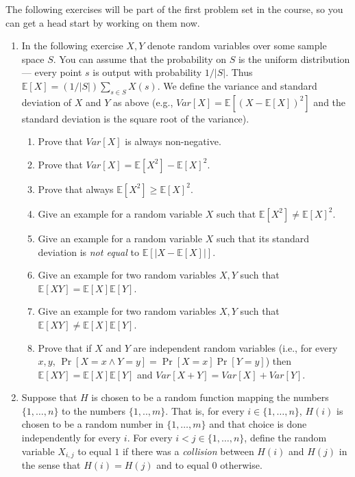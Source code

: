 The following exercises will be part of the first problem set in the
course, so you can get a head start by working on them now.

\begin{enumerate}
\def\labelenumi{\arabic{enumi}.}
\item
  In the following exercise \(X,Y\) denote random variables over some
  sample space \(S\). You can assume that the probability on \(S\) is
  the uniform distribution--- every point \(s\) is output with
  probability \(1/|S|\). Thus
  \({\mathbb{E}}[X]= (1/|S|)\sum_{s\in S}X(s)\). We define the variance
  and standard deviation of \(X\) and \(Y\) as above (e.g.,
  \(Var[X] = {\mathbb{E}}[ (X-{\mathbb{E}}[X])^2 ]\) and the standard
  deviation is the square root of the variance).

  \begin{enumerate}
  \def\labelenumii{\arabic{enumii}.}
  \item
    Prove that \(Var[X]\) is always non-negative.
  \item
    Prove that \(Var[X] = {\mathbb{E}}[X^2] - {\mathbb{E}}[X]^2\).
  \item
    Prove that always \({\mathbb{E}}[X^2] \geq {\mathbb{E}}[X]^2\).
  \item
    Give an example for a random variable \(X\) such that
    \({\mathbb{E}}[X^2] \neq {\mathbb{E}}[X]^2\).
  \item
    Give an example for a random variable \(X\) such that its standard
    deviation is \emph{not equal} to
    \({\mathbb{E}}[ | X - {\mathbb{E}}[X] | ]\).
  \item
    Give an example for two random variables \(X,Y\) such that
    \({\mathbb{E}}[\ensuremath{\mathit{XY}}] = {\mathbb{E}}[X]{\mathbb{E}}[Y]\).
  \item
    Give an example for two random variables \(X,Y\) such that
    \({\mathbb{E}}[\ensuremath{\mathit{XY}}] \neq {\mathbb{E}}[X]{\mathbb{E}}[Y]\).
  \item
    Prove that if \(X\) and \(Y\) are independent random variables
    (i.e., for every \(x,y\), \(\Pr[X=x \wedge Y=y]=\Pr[X=x]\Pr[Y=y]\))
    then
    \({\mathbb{E}}[\ensuremath{\mathit{XY}}]={\mathbb{E}}[X]{\mathbb{E}}[Y]\)
    and \(Var[X+Y]=Var[X]+Var[Y]\).
  \end{enumerate}
\item
  Suppose that \(H\) is chosen to be a random function mapping the
  numbers \(\{1,\ldots,n\}\) to the numbers \(\{1,..,m \}\). That is,
  for every \(i\in \{1,\ldots,n\}\), \(H(i)\) is chosen to be a random
  number in \(\{ 1,\ldots, m \}\) and that choice is done independently
  for every \(i\). For every \(i<j \in \{1,\ldots,n\}\), define the
  random variable \(X_{i,j}\) to equal \(1\) if there was a
  \emph{collision} between \(H(i)\) and \(H(j)\) in the sense that
  \(H(i)=H(j)\) and to equal \(0\) otherwise.


\end{enumerate}
